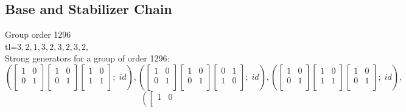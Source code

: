 \subsection*{Base and Stabilizer Chain}
Group order 1296\\
tl=$3, 2, 1, 3, 2, 3, 2, 3, 2, $\\
{\small\arraycolsep=2pt
Strong generators for a group of order 1296:
$$
\left(\left[
\begin{array}{*{2}{r}}
1 & 0\\
0 & 1\\
\end{array}
\right]
\left[
\begin{array}{*{2}{r}}
1 & 0\\
0 & 1\\
\end{array}
\right]
\left[
\begin{array}{*{2}{r}}
1 & 0\\
1 & 1\\
\end{array}
\right]
; \;
id\right)
, 
\left(\left[
\begin{array}{*{2}{r}}
1 & 0\\
0 & 1\\
\end{array}
\right]
\left[
\begin{array}{*{2}{r}}
1 & 0\\
0 & 1\\
\end{array}
\right]
\left[
\begin{array}{*{2}{r}}
0 & 1\\
1 & 0\\
\end{array}
\right]
; \;
id\right)
, 
\left(\left[
\begin{array}{*{2}{r}}
1 & 0\\
0 & 1\\
\end{array}
\right]
\left[
\begin{array}{*{2}{r}}
1 & 0\\
1 & 1\\
\end{array}
\right]
\left[
\begin{array}{*{2}{r}}
1 & 0\\
0 & 1\\
\end{array}
\right]
; \;
id\right)
, 
$$
$$
\left(\left[
\begin{array}{*{2}{r}}
1 & 0\\

\end{array}$$}
